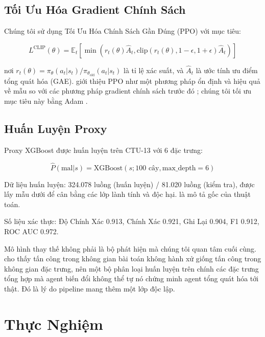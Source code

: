 \documentclass[12pt,a4paper]{report}
\begin{document}
\section{Tối Ưu Hóa Gradient Chính Sách}

Chúng tôi sử dụng Tối Ưu Hóa Chính Sách Gần Đúng (PPO) với mục tiêu:

\begin{equation}
L^{\text{CLIP}}(\theta) = \mathbb{E}_{t} \left[ \min(r_t(\theta) \hat{A}_t, \text{clip}(r_t(\theta), 1-\epsilon, 1+\epsilon) \hat{A}_t) \right]
\end{equation}

nơi $r_t(\theta) = \pi_\theta(a_t | s_t) / \pi_{\theta_{\text{old}}}(a_t | s_t)$ là tỉ lệ xác suất, và $\hat{A}_t$ là ước tính ưu điểm tổng quát hóa (GAE). \citet{schulman2017proximal} giới thiệu PPO như một phương pháp ổn định và hiệu quả về mẫu so với các phương pháp gradient chính sách trước đó \citep{sutton2000policy}; chúng tôi tối ưu mục tiêu này bằng Adam \citep{kingma2014adam}.

\section{Huấn Luyện Proxy}

Proxy XGBoost được huấn luyện trên CTU-13 với 6 đặc trưng:

\begin{equation}
\hat{P}(\text{mal} | s) = \text{XGBoost}(s; 100 \text{ cây}, \text{max\_depth}=6)
\end{equation}

Dữ liệu huấn luyện: 324.078 luồng (huấn luyện) / 81.020 luồng (kiểm tra), được lấy mẫu dưới để cân bằng các lớp lành tính và độc hại. \citet{chen2016xgboost} là mô tả gốc của thuật toán.

Số liệu xác thực: Độ Chính Xác 0.913, Chính Xác 0.921, Ghi Lại 0.904, F1 0.912, ROC AUC 0.972.

Mô hình thay thế không phải là bộ phát hiện mà chúng tôi quan tâm cuối cùng. \citet{demetrio2020intriguing} cho thấy tấn công trong không gian bài toán không hành xử giống tấn công trong không gian đặc trưng, nên một bộ phân loại huấn luyện trên chính các đặc trưng tổng hợp mà agent biến đổi không thể tự nó chứng minh agent tổng quát hóa tới \IDS{} thật. Đó là lý do pipeline mang thêm một lớp \Snort{} độc lập.

\chapter{Thực Nghiệm}
\end{document}
